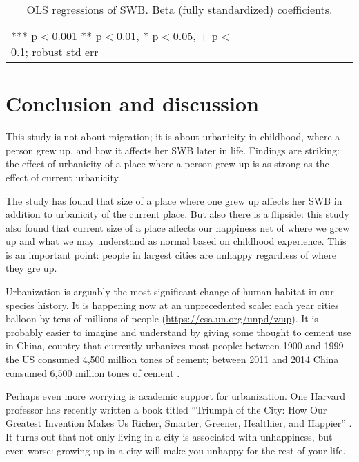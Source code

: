 \documentclass[10pt, letterpaper]{article}
\begin{document}
\begin{spacing}{2.0}
\begin{spacing}{1}
  \begin{table}[H]\centering
    \caption{OLS regressions  of SWB. Beta (fully standardized) coefficients.} \label{regAB}
    \begin{scriptsize} \begin{tabular}{p{2.1in}p{.49in}p{.49in}p{.49in}p{.49in}p{.49in}p{.49in}p{.49in}p{.49in}p{.49in}p{.49 in}}\hline
        
        \hline *** p$<$0.001 ** p$<$0.01, * p$<$0.05, + p$<$0.1; robust std err
      \end{tabular}\end{scriptsize}\end{table}
\end{spacing}





\section*{Conclusion and discussion}


This study is not about migration; %
it is about urbanicity in
childhood, where a person grew up, and how it affects her SWB later in
life. Findings are striking: the effect of urbanicity of a place where a person grew up is as strong as the effect of current urbanicity.

The study has found that size of a place where one grew up affects her SWB in
addition to urbanicity of the current place. But also there is a flipside: this
study also found that current size of a place affects our happiness net of where we
grew up and what we may understand as normal based on childhood experience. 
%
This is an important point: people in largest cities are unhappy regardless of
where they gre up. 

Urbanization is arguably the most significant change of human
habitat in our species history. It is happening now at an unprecedented scale:
each year cities balloon by tens of millions of people
(\url{https://esa.un.org/unpd/wup}). It is probably easier to imagine and
understand by giving some thought to cement use in China, country that currently urbanizes most
people: between 1900 and 1999 the US consumed 4,500 million tones of cement;
between 2011 and 2014 China consumed  6,500 million tones of cement \citep{harvey16}.

Perhaps even more worrying is academic support for urbanization. One Harvard
professor has recently written a book titled ``Triumph of the City: How Our
Greatest Invention Makes Us Richer, Smarter, Greener, Healthier, and Happier''
 \citep{glaeser11}.
It turns out that not only living in a city is associated with unhappiness, but
even worse: growing up in a city will make you unhappy for the rest of your life.


\end{spacing}
\end{document}
